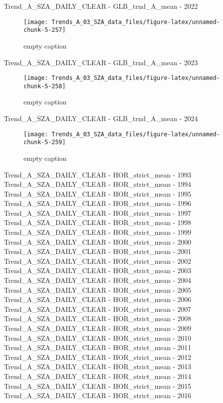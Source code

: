 \documentclass[
  10pt,
  a4paper,oneside]{article}
\begin{document}
Trend\_A\_SZA\_DAILY\_CLEAR - GLB\_trnd\_A\_mean - 2022

\begin{figure}[!ht]

{\centering \texttt{[image: Trends\_A\_03\_SZA\_data\_files/figure-latex/unnamed-chunk-5-257]} 

}

\caption{ empty caption }\label{fig:unnamed-chunk-5-257}
\end{figure}

Trend\_A\_SZA\_DAILY\_CLEAR - GLB\_trnd\_A\_mean - 2023

\begin{figure}[!ht]

{\centering \texttt{[image: Trends\_A\_03\_SZA\_data\_files/figure-latex/unnamed-chunk-5-258]} 

}

\caption{ empty caption }\label{fig:unnamed-chunk-5-258}
\end{figure}

Trend\_A\_SZA\_DAILY\_CLEAR - GLB\_trnd\_A\_mean - 2024

\begin{figure}[!ht]

{\centering \texttt{[image: Trends\_A\_03\_SZA\_data\_files/figure-latex/unnamed-chunk-5-259]} 

}

\caption{ empty caption }\label{fig:unnamed-chunk-5-259}
\end{figure}

Trend\_A\_SZA\_DAILY\_CLEAR - HOR\_strict\_mean - 1993
Trend\_A\_SZA\_DAILY\_CLEAR - HOR\_strict\_mean - 1994
Trend\_A\_SZA\_DAILY\_CLEAR - HOR\_strict\_mean - 1995
Trend\_A\_SZA\_DAILY\_CLEAR - HOR\_strict\_mean - 1996
Trend\_A\_SZA\_DAILY\_CLEAR - HOR\_strict\_mean - 1997
Trend\_A\_SZA\_DAILY\_CLEAR - HOR\_strict\_mean - 1998
Trend\_A\_SZA\_DAILY\_CLEAR - HOR\_strict\_mean - 1999
Trend\_A\_SZA\_DAILY\_CLEAR - HOR\_strict\_mean - 2000
Trend\_A\_SZA\_DAILY\_CLEAR - HOR\_strict\_mean - 2001
Trend\_A\_SZA\_DAILY\_CLEAR - HOR\_strict\_mean - 2002
Trend\_A\_SZA\_DAILY\_CLEAR - HOR\_strict\_mean - 2003
Trend\_A\_SZA\_DAILY\_CLEAR - HOR\_strict\_mean - 2004
Trend\_A\_SZA\_DAILY\_CLEAR - HOR\_strict\_mean - 2005
Trend\_A\_SZA\_DAILY\_CLEAR - HOR\_strict\_mean - 2006
Trend\_A\_SZA\_DAILY\_CLEAR - HOR\_strict\_mean - 2007
Trend\_A\_SZA\_DAILY\_CLEAR - HOR\_strict\_mean - 2008
Trend\_A\_SZA\_DAILY\_CLEAR - HOR\_strict\_mean - 2009
Trend\_A\_SZA\_DAILY\_CLEAR - HOR\_strict\_mean - 2010
Trend\_A\_SZA\_DAILY\_CLEAR - HOR\_strict\_mean - 2011
Trend\_A\_SZA\_DAILY\_CLEAR - HOR\_strict\_mean - 2012
Trend\_A\_SZA\_DAILY\_CLEAR - HOR\_strict\_mean - 2013
Trend\_A\_SZA\_DAILY\_CLEAR - HOR\_strict\_mean - 2014
Trend\_A\_SZA\_DAILY\_CLEAR - HOR\_strict\_mean - 2015
Trend\_A\_SZA\_DAILY\_CLEAR - HOR\_strict\_mean - 2016
\end{document}
